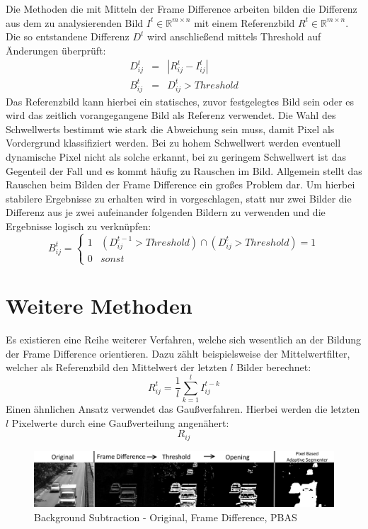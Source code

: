 Die Methoden die mit Mitteln der Frame Difference arbeiten bilden die Differenz aus dem zu analysierenden Bild \(I^t \in \mathbb{R}^{m \times n} \) mit einem Referenzbild \(R^t \in \mathbb{R}^{m \times n}\). Die so entstandene Differenz \( D^t \) wird anschlie\ss{}end mittels Threshold auf \"Anderungen \"uberpr\"uft:
\begin{eqnarray*}
 D_{ij}^t &=& |R_{ij}^t-I_{ij}^t| \\
 B_{ij}^t &=& D_{ij}^t > Threshold
\end{eqnarray*}
Das Referenzbild kann hierbei ein statisches, zuvor festgelegtes Bild sein oder es wird das zeitlich vorangegangene Bild als Referenz verwendet. Die Wahl des Schwellwerts bestimmt wie stark die Abweichung sein muss, damit Pixel als Vordergrund klassifiziert werden. Bei zu hohem Schwellwert werden eventuell dynamische Pixel nicht als solche erkannt, bei zu geringem Schwellwert ist das Gegenteil der Fall und es kommt h\"aufig zu Rauschen im Bild. Allgemein stellt das Rauschen beim Bilden der Frame Difference ein gro\ss{}es Problem dar. Um hierbei stabilere Ergebnisse zu erhalten wird in \cite{background_threeframediff} vorgeschlagen, statt nur zwei Bilder die Differenz aus je zwei aufeinander folgenden Bildern zu verwenden und die Ergebnisse logisch zu verkn\"upfen:
\begin{equation*}
 B_{ij}^t =
 \begin{cases}
  1 & (D_{ij}^{t-1} > Threshold) \cap (D_{ij}^t > Threshold) = 1 \\
  0 & sonst
 \end{cases}
\end{equation*}

\section{Weitere Methoden}

Es existieren eine Reihe weiterer Verfahren, welche sich wesentlich an der Bildung der Frame Difference orientieren. Dazu z\"ahlt beispielsweise der Mittelwertfilter, welcher als Referenzbild den Mittelwert der letzten \(l\) Bilder berechnet:
\begin{equation*}
 R_{ij}^t=\frac{1}{l}\sum_{k=1}^l I_{ij}^{t-k}
\end{equation*}
Einen \"ahnlichen Ansatz verwendet das Gau\ss{}verfahren. Hierbei werden die letzten \(l\) Pixelwerte durch eine Gau\ss{}verteilung angen\"ahert:
\begin{equation}
 R_{ij}
\end{equation}


\begin{figure}
 \centering
 \includegraphics[width=1\textwidth]{media/background/background_text.png}
 \caption{Background Subtraction - Original, Frame Difference, PBAS}
 \label{fig:background_comparison}
\end{figure}
